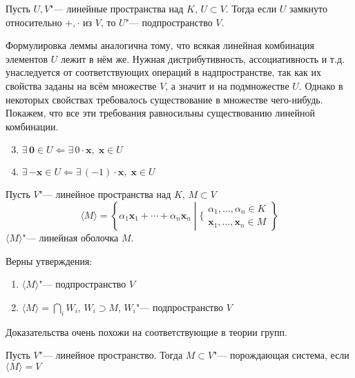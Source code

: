 \documentclass[12pt]{../../notes}
\begin{document}
\begin{lem}\label{lem:linspsign}
  Пусть $U,V$"--- линейные пространства над $K$, $U \subset V$. Тогда если $U$ замкнуто относительно
  $+, \cdot$  из  $V$, то  $U$"--- подпространство
  $V$.
\end{lem}
\begin{itlproof}
  Формулировка леммы аналогична тому, что всякая линейная комбинация элементов $U$ лежит в нём же.
  Нужная дистрибутивность, ассоциативность и т.д. унаследуется от соответствующих операций в 
  надпространстве, так как их свойства заданы на всём множестве $V$, а значит и на подмножестве $U$.
  Однако в некоторых свойствах требовалось существование в множестве чего-нибудь.
  Покажем, что все эти требования равносильны существованию линейной комбинации.
  \begin{enumerate}
      \setcounter{enumi}{2}
    \item $\exists\, \mathbf{0}\in U \Leftarrow \exists\, 0\cdot \mathbf{x},\; \mathbf{x}\in U$
    \item $\exists\, \mathbf{-x}\in U \Leftarrow \exists\, (-1)\cdot \mathbf{x},\; \mathbf{x}\in U$
  \end{enumerate}
\end{itlproof}

{ \label{defn:linshell}
Пусть $V$"--- линейное пространства над $K$, $M \subset V$
\[
  \langle M \rangle = 
  \left\{ \alpha_1 \mathbf{x}_1 + \dotsb + \alpha_n \mathbf{x}_n \middle|
  \Big\{ \begin{array}{l}
    \alpha_1, \dotsc, \alpha_n \in K\\
    \mathbf{x}_1, \dotsc, \mathbf{x}_n \in M
  \end{array} \right\}
\] 
$\langle M \rangle$"--- линейная оболочка $M$.
}

\begin{lem}\label{lem:linspan}
  Верны утверждения:
  \begin{enumerate}
    \item $\langle M \rangle$"--- подпространство $V$
    \item $ \langle M \rangle = \bigcap\limits_i W_i$, $W_i \supset M$, $W_i$"--- подпространство $V$
  \end{enumerate}
\end{lem}
\begin{itlproof}
  Доказательства очень похожи на соответствующие в теории групп.
\end{itlproof}

\begin{defn}\label{defn:linspanprop}
  Пусть $V$"--- линейное пространство. Тогда
  $M \subset V$"--- порождающая система, если $\langle M\rangle = V$
\end{defn}
\end{document}
